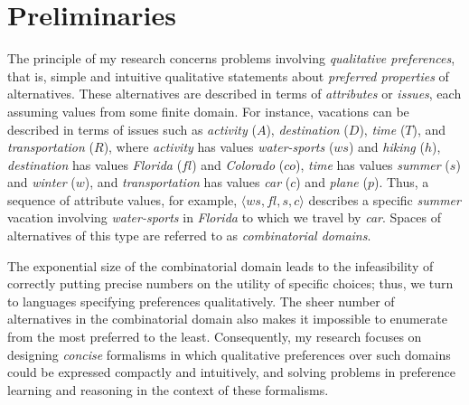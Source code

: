 \documentclass[11pt]{article}
\begin{document}
\section{Preliminaries}
\noindent The principle of my research concerns problems involving \textit{qualitative preferences}, that is,
simple and intuitive qualitative statements about \textit{preferred properties}
of alternatives.
These alternatives are described in terms of \textit{attributes} or \textit{issues}, 
each assuming values from some finite domain.
For instance, vacations can be described in terms of issues such as
\textit{activity} ($A$), \textit{destination} ($D$), \textit{time} ($T$), and \textit{transportation} ($R$),
where \textit{activity} has values \textit{water-sports} ($ws$) and \textit{hiking} ($h$),
\textit{destination} has values \textit{Florida} ($fl$) and \textit{Colorado} ($co$),
\textit{time} has values \textit{summer} ($s$) and \textit{winter} ($w$), and
\textit{transportation} has values \textit{car} ($c$) and \textit{plane} ($p$).
Thus, a sequence of attribute values, for example,
$\langle ws, fl, s, c \rangle$
describes a specific \textit{summer} vacation involving \textit{water-sports} 
in \textit{Florida} to which we travel by \textit{car}.
Spaces of alternatives of this type are referred to as \textit{combinatorial domains}.

The exponential size of the combinatorial domain leads to the infeasibility of
correctly putting precise numbers on the utility of specific choices; thus,
we turn to languages specifying preferences qualitatively.
The sheer number of alternatives in the combinatorial domain also makes it
impossible to enumerate from the most preferred to the least.
Consequently, my research focuses on designing \textit{concise} formalisms
in which qualitative preferences over such domains could be expressed
compactly and intuitively, and solving problems in preference learning and reasoning
in the context of these formalisms.
\end{document}
